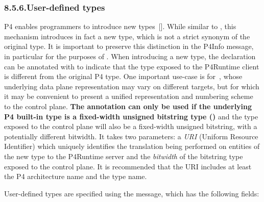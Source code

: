 \documentclass[11pt]{article}
\begin{document}
{%
\subsubsection{8.5.6.\hspace*{0.5em}User-defined types}\label{sec-user-defined-types}%

\noindent{}P4 enables programmers to introduce new types~[]. While similar
to , this mechanism introduces in fact a new type, which is not a
strict synonym of the original type. It is important to preserve this
distinction in the P4Info message, in particular for the purposes of
. When introducing a new type, the
declaration can be annotated with  to indicate that the
type exposed to the P4Runtime client is different from the original P4 type. One
important use-case is for~,
whose underlying data plane representation may vary on different targets, but
for which it may be convenient to present a unified representation and numbering
scheme to the control plane. \textbf{The  annotation can only
be used if the underlying P4 built-in type is a fixed-width unsigned bitstring
type ()} and the type exposed to the control plane will also be a
fixed-width unsigned bitstring, with a potentially different bitwidth. It takes
two parameters: a \emph{URI} (Uniform Resource Identifier) which uniquely identifies
the translation being performed on entities of the new type to the P4Runtime
server and the \emph{bitwidth} of the bitstring type exposed to the control plane. It
is recommended that the URI includes at least the P4 architecture name and the
type name.%

User-defined types are specified using the  message, which has
the following fields:%

}
\end{document}
